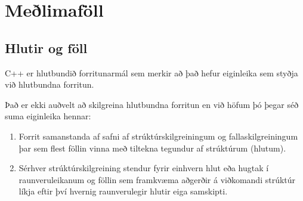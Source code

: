 





\chapter{Meðlimaföll}

\section{Hlutir og föll}

C++ er hlutbundið forritunarmál sem merkir að það hefur eiginleika sem styðja við hlutbundna forritun.

Það er ekki auðvelt að skilgreina hlutbundna forritun en við höfum þó þegar séð suma eiginleika hennar:

\begin{enumerate}

\item Forrit samanstanda af safni af strúktúrskilgreiningum og fallaskilgreiningum 
þar sem flest föllin vinna með tiltekna tegundur af strúktúrum (hlutum).

\item Sérhver strúktúrskilgreining stendur fyrir einhvern hlut eða hugtak í raunveruleikanum og föllin sem framkvæma aðgerðir á viðkomandi strúktúr
líkja eftir því hvernig raunverulegir hlutir eiga samskipti.

\end{enumerate}

